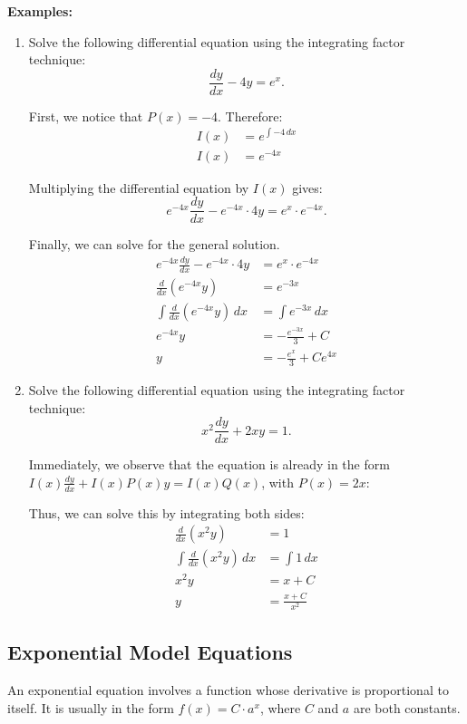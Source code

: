 \noindent \textbf{Examples:}
\begin{enumerate}
	\item Solve the following differential equation using the integrating factor technique:
	\[ \frac{dy}{dx} - 4y = e^x. \]

	First, we notice that $P(x) = -4$. Therefore:
	\begin{align*}
		I(x) &= e^{\int -4 \, dx} \\
		I(x) &= e^{-4x}
	\end{align*}

	Multiplying the differential equation by $I(x)$ gives:
	\[ e^{-4x} \frac{dy}{dx} - e^{-4x} \cdot 4y = e^x \cdot e^{-4x}. \]

	Finally, we can solve for the general solution.
	\begin{align*}
		e^{-4x} \frac{dy}{dx} - e^{-4x} \cdot 4y &= e^x \cdot e^{-4x} \\[5pt]
		\frac{d}{dx} \left( e^{-4x}y \right) &= e^{-3x} \\[5pt]
		\int \frac{d}{dx} \left( e^{-4x}y \right) \, dx &= \int e^{-3x} \, dx \\[5pt]
		e^{-4x}y &= -\frac{e^{-3x}}{3} + C \\[5pt]
		y &= -\frac{e^x}{3} + C e^{4x}
	\end{align*}

	\item Solve the following differential equation using the integrating factor technique:
	\[ x^2 \frac{dy}{dx} + 2xy = 1. \]

	Immediately, we observe that the equation is already in the form $I(x) \frac{dy}{dx} + I(x) P(x)y = I(x) Q(x)$, with $P(x) = 2x$:

	Thus, we can solve this by integrating both sides:
	\begin{align*}
		\frac{d}{dx} \left( x^2 y \right) &= 1 \\[5pt]
		\int \frac{d}{dx} \left( x^2 y \right) \, dx &= \int 1 \, dx \\[5pt]
		x^2 y &= x + C \\
		y &= \frac{x + C}{x^2}
	\end{align*}
\end{enumerate}

\subsection{Exponential Model Equations}
An exponential equation involves a function whose derivative is proportional to itself. It is usually in the form $f(x) = C \cdot a^x$, where $C$ and $a$ are both constants.

